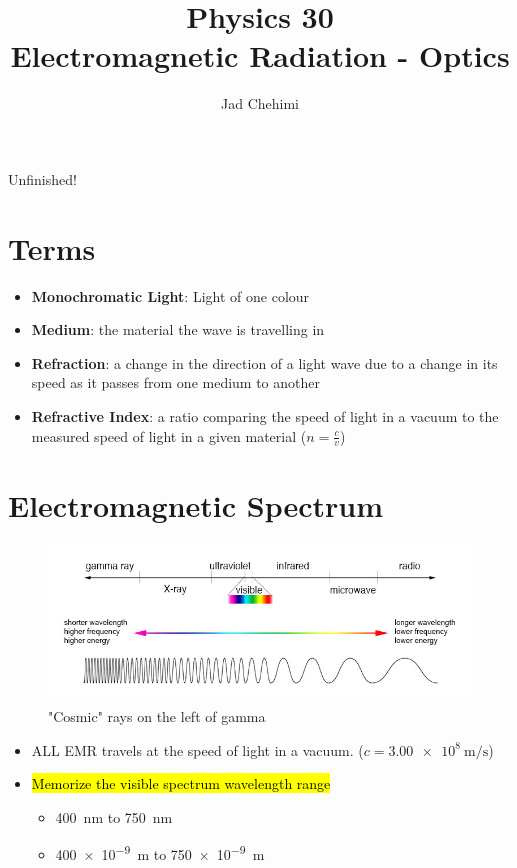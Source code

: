 \documentclass[a4paper,12pt]{article}
\title{Physics 30 \\ Electromagnetic Radiation - Optics}
\author{Jad Chehimi}
\begin{document}
\maketitle

\begin{center}
\Huge
Unfinished!
\normalsize
\end{center}

\tableofcontents

\pagebreak

\section{Terms}
\begin{itemize}
    \item{\textbf{Monochromatic Light}: Light of one colour}
    \item{\textbf{Medium}: the material the wave is travelling in}
    \item{\textbf{Refraction}: a change in the direction of a light wave due to a change in its speed as it passes from one medium to another}
    \item{\textbf{Refractive Index}: a ratio comparing the speed of light in a vacuum to the measured speed of light in a given material ($n = \frac{c}{v}$)}
\end{itemize}

\section{Electromagnetic Spectrum}
\begin{figure}[H]
    \centering
    \caption{"Cosmic" rays on the left of gamma}
    \includegraphics[width=\textwidth]{emr}
\end{figure}
\begin{itemize}
    \item{ALL EMR travels at the speed of light in a vacuum. ($c = \SI{3.00e8}{\m\per\s}$)}
    \item{
        \hl{Memorize the visible spectrum wavelength range}
        \begin{itemize}
            \item{\SI{400}{\nano\m} to \SI{750}{\nano\m}}
            \item{\SI{400e-9}{\m} to \SI{750e-9}{\m}}
        \end{itemize}
    }
\end{itemize}
\end{document}
